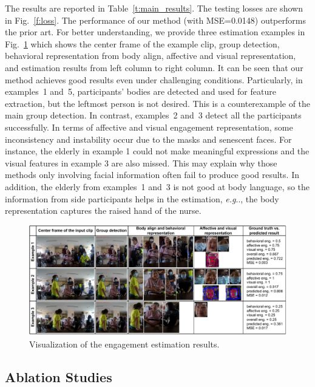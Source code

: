 \documentclass[VANCOUVER,STIX1COL]{WileyNJD-v2}
\makeatletter
\DeclareRobustCommand\onedot{\futurelet\@let@token\@onedot}
\def\@onedot{\ifx\@let@token.\else.\null\fi\xspace}
\def\eg{\emph{e.g}\onedot}
\makeatother
\begin{document}
The results are reported in Table~\ref{t:main_results}. The testing losses are shown in Fig.~\ref{f:loss}. The performance of our method (with MSE=0.0148) outperforms the prior art. For better understanding, we provide three estimation examples in Fig.~\ref{f:visualization} which shows the center frame of the example clip, group detection, behavioral representation from body align, affective and visual representation, and estimation results from left column to right column. It can be seen that our method achieves good results even under challenging conditions. Particularly, in examples~1 and~5, participants' bodies are detected and used for feature extraction, but the leftmost person is not desired. This is a counterexample of the main group detection. In contrast, examples~2 and~3 detect all the participants successfully. In terms of affective and visual engagement representation, some inconsistency and instability occur due to the masks and senescent faces. For instance, the elderly in example 1 could not make meaningful expressions and the visual features in example 3 are also missed. This may explain why those methods only involving facial information often fail to produce good results. In addition, the elderly from examples~1 and~3 is not good at body language, so the information from side participants helps in the estimation, \eg, the body representation captures the raised hand of the nurse.

\begin{figure}[t]
  \centering
  \includegraphics[width=\linewidth]{assets/visualization}
  \caption{Visualization of the engagement estimation results.}
  \label{f:visualization}
\end{figure}


\subsection{Ablation Studies}
\label{subs:Ablation_Studies}
\end{document}
